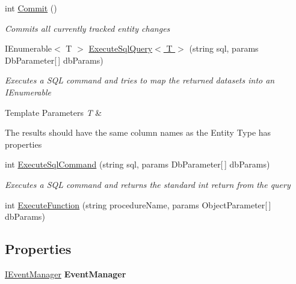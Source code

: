 \begin{DoxyCompactItemize}
int \hyperlink{interface_highway_1_1_data_1_1_interfaces_1_1_i_data_context_a11952cf19e2562bcd82edd9c239c1aac}{Commit} ()
\begin{DoxyCompactList}\small\item\em Commits all currently tracked entity changes \end{DoxyCompactList}\item 
I\-Enumerable$<$ T $>$ \hyperlink{interface_highway_1_1_data_1_1_interfaces_1_1_i_data_context_a975fee919078b8770313b4b8582554e5}{Execute\-Sql\-Query$<$ T $>$} (string sql, params Db\-Parameter\mbox{[}$\,$\mbox{]} db\-Params)
\begin{DoxyCompactList}\small\item\em Executes a S\-Q\-L command and tries to map the returned datasets into an I\-Enumerable
\begin{DoxyTemplParams}{Template Parameters}
{\em T} & \\
\hline
\end{DoxyTemplParams}
The results should have the same column names as the Entity Type has properties \end{DoxyCompactList}\item 
int \hyperlink{interface_highway_1_1_data_1_1_interfaces_1_1_i_data_context_ad8d3d00bdfca146ea8197e050a215be3}{Execute\-Sql\-Command} (string sql, params Db\-Parameter\mbox{[}$\,$\mbox{]} db\-Params)
\begin{DoxyCompactList}\small\item\em Executes a S\-Q\-L command and returns the standard int return from the query \end{DoxyCompactList}\item 
int \hyperlink{interface_highway_1_1_data_1_1_interfaces_1_1_i_data_context_a27f9736cd139560b0b5debe9a7bc795a}{Execute\-Function} (string procedure\-Name, params Object\-Parameter\mbox{[}$\,$\mbox{]} db\-Params)
\begin{DoxyCompactList}\small\item\em \end{DoxyCompactList}\end{DoxyCompactItemize}
\subsection*{Properties}
\begin{DoxyCompactItemize}
\item 
\hypertarget{interface_highway_1_1_data_1_1_interfaces_1_1_i_data_context_a66d20c659a7c50d08705534ad750e1f8}{\hyperlink{interface_highway_1_1_data_1_1_interfaces_1_1_i_event_manager}{I\-Event\-Manager} {\bfseries Event\-Manager}}\label{interface_highway_1_1_data_1_1_interfaces_1_1_i_data_context_a66d20c659a7c50d08705534ad750e1f8}

\end{DoxyCompactItemize}



